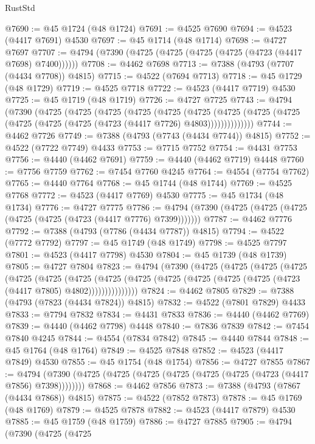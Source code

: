 \begin{lexlean}{RustStd}
\begin{coremodule}
{\begin{coremodule}
{{{{{{{{{{{{{{{{{{{{{{{{{{{{{{{{{{{{{{{{{{{{{{{{{{{{{{{{{{{{@7690 := @45 @1724 (@48 @1724)
@7691 := @4525 @7690
@7694 := @4523 (@4417 @7691) @4530
@7697 := @45 @1714 (@48 @1714)
@7698 := @4727 @7697
@7707 := @4794 (@7390 (@4725 (@4725 (@4725 (@4725 (@4723 (@4417 @7698) @7400))))))
@7708 := @4462 @7698
@7713 := @7388 (@4793 (@7707 (@4434 @7708)) @4815)
@7715 := @4522 (@7694 @7713)
@7718 := @45 @1729 (@48 @1729)
@7719 := @4525 @7718
@7722 := @4523 (@4417 @7719) @4530
@7725 := @45 @1719 (@48 @1719)
@7726 := @4727 @7725
@7743 := @4794
    (@7390
      (@4725
        (@4725
          (@4725
            (@4725
              (@4725
                (@4725
                  (@4725 (@4725 (@4725 (@4725 (@4725 (@4725 (@4723 (@4417 @7726) @4803))))))))))))))
@7744 := @4462 @7726
@7749 := @7388 (@4793 (@7743 (@4434 @7744)) @4815)
@7752 := @4522 (@7722 @7749) @4433
@7753 := @7715 @7752
@7754 := @4431 @7753
@7756 := @4440 (@4462 @7691)
@7759 := @4440 (@4462 @7719) @4448
@7760 := @7756 @7759
@7762 := @7454 @7760 @4245
@7764 := @4554 (@7754 @7762)
@7765 := @4440 @7764
@7768 := @45 @1744 (@48 @1744)
@7769 := @4525 @7768
@7772 := @4523 (@4417 @7769) @4530
@7775 := @45 @1734 (@48 @1734)
@7776 := @4727 @7775
@7786 := @4794 (@7390 (@4725 (@4725 (@4725 (@4725 (@4725 (@4723 (@4417 @7776) @7399)))))))
@7787 := @4462 @7776
@7792 := @7388 (@4793 (@7786 (@4434 @7787)) @4815)
@7794 := @4522 (@7772 @7792)
@7797 := @45 @1749 (@48 @1749)
@7798 := @4525 @7797
@7801 := @4523 (@4417 @7798) @4530
@7804 := @45 @1739 (@48 @1739)
@7805 := @4727 @7804
@7823 := @4794
    (@7390
      (@4725
        (@4725
          (@4725
            (@4725
              (@4725
                (@4725
                  (@4725
                    (@4725
                      (@4725 (@4725 (@4725 (@4725 (@4725 (@4723 (@4417 @7805) @4802)))))))))))))))
@7824 := @4462 @7805
@7829 := @7388 (@4793 (@7823 (@4434 @7824)) @4815)
@7832 := @4522 (@7801 @7829) @4433
@7833 := @7794 @7832
@7834 := @4431 @7833
@7836 := @4440 (@4462 @7769)
@7839 := @4440 (@4462 @7798) @4448
@7840 := @7836 @7839
@7842 := @7454 @7840 @4245
@7844 := @4554 (@7834 @7842)
@7845 := @4440 @7844
@7848 := @45 @1764 (@48 @1764)
@7849 := @4525 @7848
@7852 := @4523 (@4417 @7849) @4530
@7855 := @45 @1754 (@48 @1754)
@7856 := @4727 @7855
@7867 := @4794 (@7390 (@4725 (@4725 (@4725 (@4725 (@4725 (@4725 (@4723 (@4417 @7856) @7398))))))))
@7868 := @4462 @7856
@7873 := @7388 (@4793 (@7867 (@4434 @7868)) @4815)
@7875 := @4522 (@7852 @7873)
@7878 := @45 @1769 (@48 @1769)
@7879 := @4525 @7878
@7882 := @4523 (@4417 @7879) @4530
@7885 := @45 @1759 (@48 @1759)
@7886 := @4727 @7885
@7905 := @4794
    (@7390
      (@4725
        (@4725
}}}}}}}}}}}}}}}}}}}}}}}}}}}}}}}}}}}}}}}}}}}}}}}}}}}}}}}}}}}}
\end{coremodule}}
\end{coremodule}
\end{lexlean}
